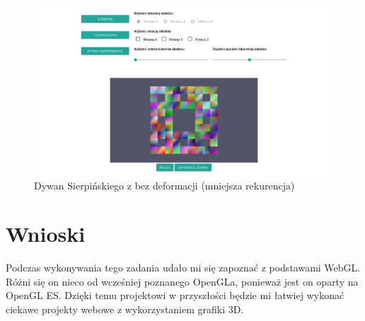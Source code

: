 \documentclass[12pt,a4paper,titlepage]{article}
\begin{document}
\begin{figure}[H]
\centering
\includegraphics[width=14cm]{images/carpet_still_no_disruption_smaller_level.png}
\caption{Dywan Sierpińskiego z bez deformacji (mniejsza rekurencja)}
\label{fig:eggWithLight}
\end{figure}

\section{Wnioski}
Podczas wykonywania tego zadania udało mi się zapoznać z podstawami WebGL. Różni się on nieco od wcześniej poznanego OpenGLa, ponieważ jest on oparty na OpenGL ES. Dzięki temu projektowi w przyszłości będzie mi łatwiej wykonać ciekawe projekty webowe z wykorzystaniem grafiki 3D.
\newpage



\listoffigures
\listoflistings
\end{document}
